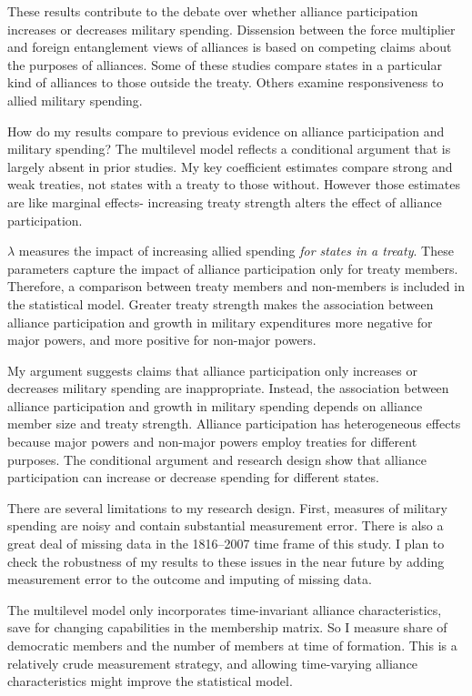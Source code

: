 \documentclass[12pt]{article}
\begin{document}
These results contribute to the debate over whether alliance participation increases or decreases military spending. 
Dissension between the force multiplier and foreign entanglement views of alliances is based on competing claims about the purposes of alliances. 
Some of these studies compare states in a particular kind of alliances to those outside the treaty. 
Others examine responsiveness to allied military spending. 


How do my results compare to previous evidence on alliance participation and military spending? 
The multilevel model reflects a conditional argument that is largely absent in prior studies. 
My key coefficient estimates compare strong and weak treaties, not states with a treaty to those without. 
However those estimates are like marginal effects- increasing treaty strength alters the effect of alliance participation.

 
$\lambda$ measures the impact of increasing allied spending \textit{for states in a treaty}. 
These parameters capture the impact of alliance participation only for treaty members. 
Therefore, a comparison between treaty members and non-members is included in the statistical model. 
Greater treaty strength makes the association between alliance participation and growth in military expenditures more negative for major powers, and more positive for non-major powers. 


My argument suggests claims that alliance participation only increases or decreases military spending are inappropriate. 
Instead, the association between alliance participation and growth in military spending depends on alliance member size and treaty strength. 
Alliance participation has heterogeneous effects because major powers and non-major powers employ treaties for different purposes. 
The conditional argument and research design show that alliance participation can increase or decrease spending for different states. 


There are several limitations to my research design.
First, measures of military spending are noisy and contain substantial measurement error. 
There is also a great deal of missing data in the 1816--2007 time frame of this study. 
I plan to check the robustness of my results to these issues in the near future by adding measurement error to the outcome and imputing of missing data.


The multilevel model only incorporates time-invariant alliance characteristics, save for changing capabilities in the membership matrix. 
So I measure share of democratic members and the number of members at time of formation. 
This is a relatively crude measurement strategy, and allowing time-varying alliance characteristics might improve the statistical model. 
\end{document}
